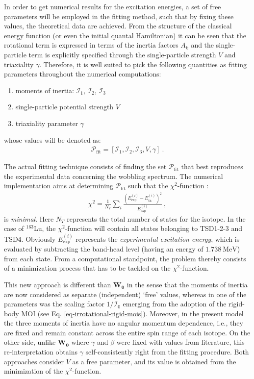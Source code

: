In order to get numerical results for the excitation energies, a set of free parameters will be employed in the fitting method, such that by fixing these values, the theoretical data are achieved. From the structure of the classical energy function (or even the initial quantal Hamiltonian) it can be seen that the rotational term is expressed in terms of the inertia factors $A_k$ and the single-particle term is explicitly specified through the single-particle strength $V$ and triaxiality $\gamma$. Therefore, it is well suited to pick the following quantities as fitting parameters throughout the numerical computations:
\begin{enumerate}
    \item moments of inertia: $\mathcal{I}_1$, $\mathcal{I}_2$, $\mathcal{I}_3$
    \item single-particle potential strength $V$
    \item triaxiality parameter $\gamma$
\end{enumerate}
whose values will be denoted as:
\begin{align}
    \mathcal{P}_\text{fit}=\left[\mathcal{I}_1,\mathcal{I}_2,\mathcal{I}_3,V,\gamma\right]\ .
    \label{fitting-parameters-p-fit}
\end{align}

The actual fitting technique consists of finding the set $\mathcal{P}_\text{fit}$ that best reproduces the experimental data concerning the wobbling spectrum. The numerical implementation aims at determining $\mathcal{P}_\text{fit}$ such that the $\chi^2$-function \cite{poenaru2021extensive1} :
\begin{align}
    \chi^2=\frac{1}{N_T}\sum_i\frac{\left(E_\text{exp}^{(i)}-E_\text{th}^{(i)}\right)^2}{E_\text{exp}^{(i)}}\ ,
    \label{chi-2-fitting-function}
\end{align}
is \emph{minimal}. Here $N_T$ represents the total number of states for the isotope. In the case of $^{163}$Lu, the $\chi^2$-function will contain all states belonging to TSD1-2-3 and TSD4. Obviously $E_\text{exp}^{(i)}$ represents the \emph{experimental excitation energy}, which is evaluated by subtracting the band-head level (having an energy of $1.738\ \text{MeV}$) from each state. From a computational standpoint, the problem thereby consists of a minimization process that has to be tackled on the $\chi^2$-function.

This new approach is different than $\mathbf{W_0}$ in the sense that the moments of inertia are now considered as separate (independent) `free' values, whereas in \cite{raduta2017semiclassical} one of the parameters was the scaling factor $1/\mathcal{I}_0$ emerging from the adoption of the rigid-body MOI (see Eq. \ref{eq-irrotational-rigid-mois}). Moreover, in the present model the three moments of inertia have no angular momentum dependence, i.e., they are fixed and remain constant across the entire spin range of each isotope. On the other side, unlike $\mathbf{W_0}$ where $\gamma$ and $\beta$ were fixed with values from literature, this re-interpretation obtains $\gamma$ self-consistently right from the fitting procedure. Both approaches consider $V$ as a free parameter, and its value is obtained from the minimization of the $\chi^2$-function.

